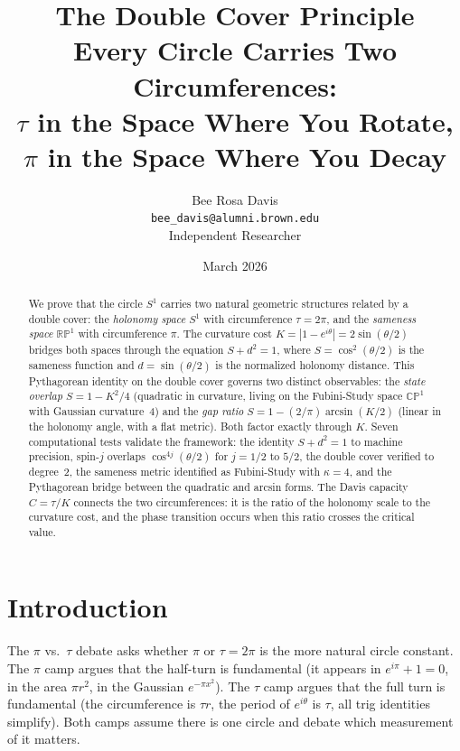 \documentclass[11pt,letterpaper]{article}
\title{\textbf{The Double Cover Principle} \\[6pt]
\large Every Circle Carries Two Circumferences: \\
$\tau$ in the Space Where You Rotate, $\pi$ in the Space Where You Decay}
\author{Bee Rosa Davis \\
\texttt{bee\_davis@alumni.brown.edu} \\
Independent Researcher}
\date{March 2026}
\begin{document}
\maketitle

\begin{abstract}
We prove that the circle $S^1$ carries two natural geometric structures related by a double cover: the \emph{holonomy space} $S^1$ with circumference $\tau = 2\pi$, and the \emph{sameness space} $\mathbb{RP}^1$ with circumference $\pi$. The curvature cost $K = |1 - e^{i\theta}| = 2\sin(\theta/2)$ bridges both spaces through the equation $S + d^2 = 1$, where $S = \cos^2(\theta/2)$ is the sameness function and $d = \sin(\theta/2)$ is the normalized holonomy distance. This Pythagorean identity on the double cover governs two distinct observables: the \emph{state overlap} $S = 1 - K^2/4$ (quadratic in curvature, living on the Fubini-Study space $\mathbb{CP}^1$ with Gaussian curvature~4) and the \emph{gap ratio} $S = 1 - (2/\pi)\arcsin(K/2)$ (linear in the holonomy angle, with a flat metric). Both factor exactly through $K$. Seven computational tests validate the framework: the identity $S + d^2 = 1$ to machine precision, spin-$j$ overlaps $\cos^{4j}(\theta/2)$ for $j = 1/2$ to $5/2$, the double cover verified to degree~2, the sameness metric identified as Fubini-Study with $\kappa = 4$, and the Pythagorean bridge between the quadratic and arcsin forms. The Davis capacity $C = \tau/K$ connects the two circumferences: it is the ratio of the holonomy scale to the curvature cost, and the phase transition occurs when this ratio crosses the critical value.
\end{abstract}

\tableofcontents
\newpage


\section{Introduction}

The $\pi$ vs.\ $\tau$ debate asks whether $\pi$ or $\tau = 2\pi$ is the more natural circle constant. The $\pi$ camp argues that the half-turn is fundamental (it appears in $e^{i\pi} + 1 = 0$, in the area $\pi r^2$, in the Gaussian $e^{-\pi x^2}$). The $\tau$ camp argues that the full turn is fundamental (the circumference is $\tau r$, the period of $e^{i\theta}$ is $\tau$, all trig identities simplify). Both camps assume there is one circle and debate which measurement of it matters.
\end{document}
